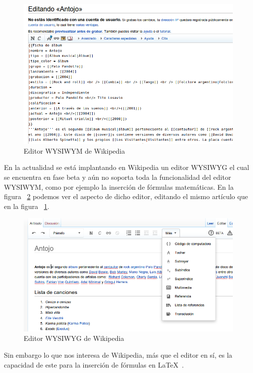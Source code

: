 \begin{figure}[h!]
  \centering
      \includegraphics[width=1.0\textwidth]{fig/wiki_wysiwym}
  \caption{Editor WYSIWYM de Wikipedia}
  \label{fig:wiki_wysiwym}
\end{figure}

En la actualidad se está implantando en Wikipedia un editor WYSIWYG el cual se encuentra en fase beta y aún no soporta toda la funcionalidad del editor WYSIWYM, como por ejemplo la inserción de fórmulas matemáticas. En la figura ~\ref{fig:wiki_wysiwyg} podemos ver el aspecto de dicho editor, editando el mismo artículo que en la figura ~\ref{fig:wiki_wysiwym}.

\begin{figure}[h!]
  \centering
      \includegraphics[width=1.0\textwidth]{fig/wiki_wysiwyg}
  \caption{Editor WYSIWYG de Wikipedia}
  \label{fig:wiki_wysiwyg}
\end{figure}

Sin embargo lo que nos interesa de Wikipedia, más que el editor en sí, es la capacidad de este para la inserción de fórmulas en {\LaTeX}~\cite{wikiform}.

